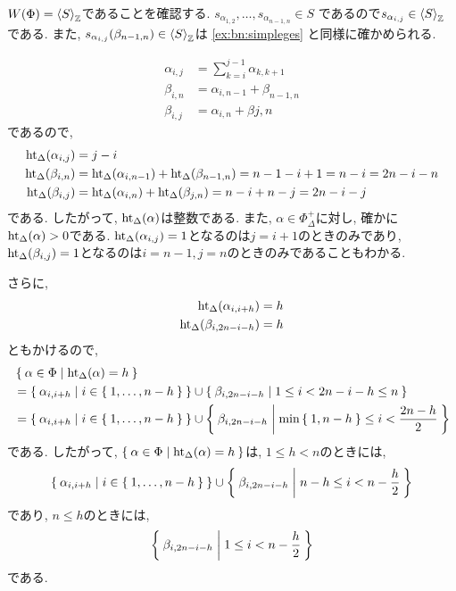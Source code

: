 $W(\Phi)=\Braket{S}_{\mathbb{Z}}$であることを確認する.
$s_{\alpha_{1,2}},\ldots,s_{\alpha_{n-1,n}}\in S$
であるので$s_{\alpha_{i,j}}\in\Braket{S}_{\mathbb{Z}}$である.
また, $s_{\alpha_{i,j}}(\beta_{n-1,n})\in\Braket{S}_{\mathbb{Z}}$は
\cref{ex:bn:simpleges}
と同様に確かめられる.

\begin{align*}
\alpha_{i,j}&=\sum_{k=i}^{j-1}\alpha_{k,k+1}\\
\beta_{i,n}&=\alpha_{i,n-1}+\beta_{n-1,n}\\
\beta_{i,j}&=\alpha_{i,n}+\beta{j,n}
\end{align*}
であるので, 
\begin{align*}
  \operatorname{ht}_\Delta(\alpha_{i,j})&=j-i\\
  \operatorname{ht}_\Delta(\beta_{i,n})&=\operatorname{ht}_\Delta(\alpha_{i,n-1})+\operatorname{ht}_\Delta(\beta_{n-1,n})=n-1-i+1=n-i=2n-i-n\\
\operatorname{ht}_\Delta(\beta_{i,j})&=\operatorname{ht}_\Delta(\alpha_{i,n})+\operatorname{ht}_\Delta(\beta_{j,n})=n-i+n-j=2n-i-j
\end{align*}
である. 
したがって, $\operatorname{ht}_\Delta(\alpha)$は整数である.
また,
$\alpha\in\Phi_\Delta^+$に対し, 確かに$\operatorname{ht}_{\Delta}(\alpha)>0$である.
$\operatorname{ht}_\Delta(\alpha_{i,j})=1$となるのは$j=i+1$のときのみであり,
$\operatorname{ht}_\Delta(\beta_{i,j})=1$となるのは$i=n-1,j=n$のときのみであることもわかる.

さらに,
\begin{align*}
  \operatorname{ht}_\Delta(\alpha_{i,i+h})&=h\\
  \operatorname{ht}_\Delta(\beta_{i,2n-i-h})&=h
\end{align*}
ともかけるので,
\begin{align*}
  &\Set{\alpha\in\Phi|\operatorname{ht}_\Delta(\alpha)=h}\\
  &=\Set{\alpha_{i,i+h}|i\in\Set{1,\ldots,n-h}}
  \cup
  \Set{\beta_{i,2n-i-h}|1\leq i < 2n-i-h\leq n}\\
  &=\Set{\alpha_{i,i+h}|i\in\Set{1,\ldots,n-h}}
  \cup
  \Set{\beta_{i,2n-i-h}|\min\Set{1,n-h} \leq i < \frac{2n-h}{2}}
\end{align*}
である.  したがって,
$\Set{\alpha\in\Phi|\operatorname{ht}_\Delta(\alpha)=h}$は,
$1\leq h<n$のときには,
\begin{align*}
\Set{\alpha_{i,i+h}|i\in\Set{1,\ldots,n-h}}
  \cup
  \Set{\beta_{i,2n-i-h}|n-h \leq i < n-\frac{h}{2}}
\end{align*}
であり, $n\leq h $のときには,
\begin{align*}
\Set{\beta_{i,2n-i-h}|1 \leq i < n-\frac{h}{2}}
\end{align*}
である.

